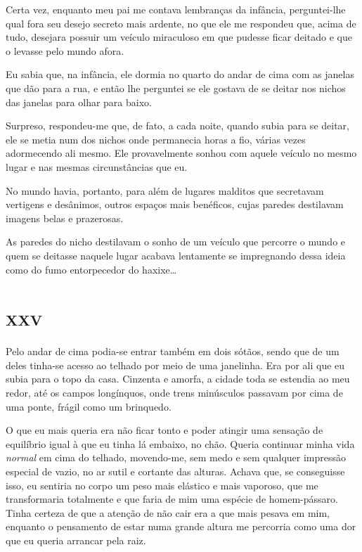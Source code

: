 Certa vez, enquanto meu pai me contava lembranças da infância, perguntei-lhe qual fora seu desejo secreto mais ardente, no que ele me respondeu que, acima de tudo, desejara possuir um veículo miraculoso em que pudesse ficar deitado e que o levasse pelo mundo afora.

Eu sabia que, na infância, ele dormia no quarto do andar de cima com as janelas que dão para a rua, e então lhe perguntei se ele gostava de se deitar nos nichos das janelas para olhar para baixo.

Surpreso, respondeu-me que, de fato, a cada noite, quando subia para se deitar, ele se metia num dos nichos onde permanecia horas a fio, várias vezes adormecendo ali mesmo. Ele provavelmente sonhou com aquele veículo no mesmo lugar e nas mesmas circunstâncias que eu.

No mundo havia, portanto, para além de lugares malditos que secretavam vertigens e desânimos, outros espaços mais benéficos, cujas paredes destilavam imagens belas e prazerosas.

As paredes do nicho destilavam o sonho de um veículo que percorre o mundo e quem se deitasse naquele lugar acabava lentamente se impregnando dessa ideia como do fumo entorpecedor do haxixe\dots


\chapter*{\huge\centering\textsc{xxv}}

Pelo andar de cima podia-se entrar também em dois sótãos, sendo que de um deles tinha-se acesso ao telhado por meio de uma janelinha. Era por ali que eu subia para o topo da casa. Cinzenta e amorfa, a cidade toda se estendia ao meu redor, até os campos longínquos, onde trens minúsculos passavam por cima de uma ponte, frágil como um brinquedo.

O que eu mais queria era não ficar tonto e poder atingir uma sensação de equilíbrio igual à que eu tinha lá embaixo, no chão. Queria continuar minha vida \textit{normal} em cima do telhado, movendo-me, sem medo e sem qualquer impressão especial de vazio, no ar sutil e cortante das alturas. Achava que, se conseguisse isso, eu sentiria no corpo um peso mais elástico e mais vaporoso, que me transformaria totalmente e que faria de mim uma espécie de homem-pássaro. Tinha certeza de que a atenção de não cair era a que mais pesava em mim, enquanto o pensamento de estar numa grande altura me percorria como uma dor que eu queria arrancar pela raiz.

